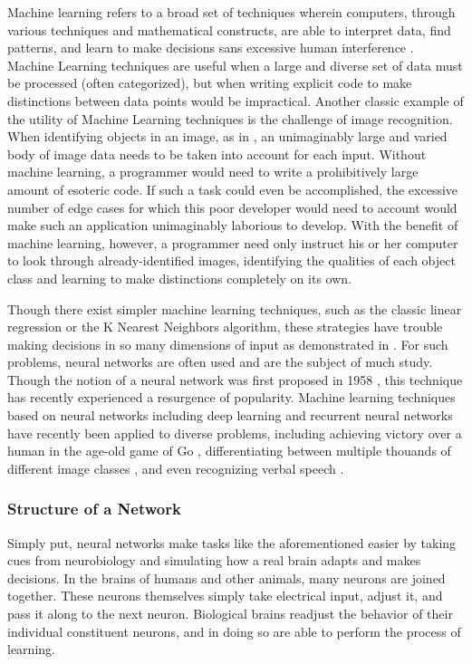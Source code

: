 \documentclass{article}
\begin{document}
Machine learning refers to a broad set of techniques wherein computers, through various techniques and mathematical constructs, are able to interpret data, find patterns, and learn to make decisions sans excessive human interference \cite{sasml}. Machine Learning techniques are useful when a large and diverse set of data must be processed (often categorized), but when writing explicit code to make distinctions between data points would be impractical. Another classic example of the utility of Machine Learning techniques is the challenge of image recognition. When identifying objects in an image, as in \cite{hinton12}, an unimaginably large and varied body of image data needs to be taken into account for each input. Without machine learning, a programmer would need to write a prohibitively large amount of esoteric code. If such a task could even be accomplished, the excessive number of edge cases for which this poor developer would need to account would make such an application unimaginably laborious to develop. With the benefit of machine learning, however, a programmer need only instruct his or her computer to look through already-identified images, identifying the qualities of each object class and learning to make distinctions completely on its own.

Though there exist simpler machine learning techniques, such as the classic linear regression or the K Nearest Neighbors algorithm, these strategies have trouble making decisions in so many dimensions of input as demonstrated in \cite{knnic}. For such problems, neural networks are often used and are the subject of much study. Though the notion of a neural network was first proposed in 1958 \cite{rosenblatt58}, this technique has recently experienced a resurgence of popularity. Machine learning techniques based on neural networks including deep learning \cite{mitdeeplearning} and recurrent neural networks \cite{recurrentsurvey} have recently been applied to diverse problems, including achieving victory over a human in the age-old game of Go \cite{go1}\cite{go2}, differentiating between multiple thouands of different image classes \cite{hinton12}, and even recognizing verbal speech \cite{rnnspoken}.

\subsubsection{Structure of a Network}
Simply put, neural networks make tasks like the aforementioned easier by taking cues from neurobiology and simulating how a real brain adapts and makes decisions. In the brains of humans and other animals, many neurons are joined together. These neurons themselves simply take electrical input, adjust it, and pass it along to the next neuron. Biological brains readjust the behavior of their individual constituent neurons, and in doing so are able to perform the process of learning.
\end{document}
